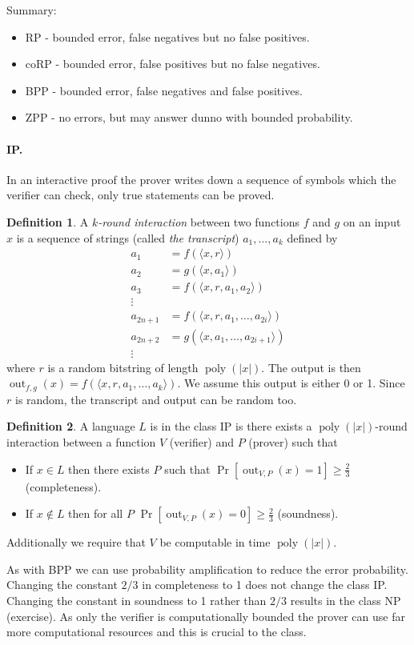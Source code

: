 \documentclass[11pt,a4paper]{article}
\theoremstyle{definition}
\newtheorem{defn}{Definition}
\DeclareMathOperator{\poly}{poly}
\DeclareMathOperator{\out}{out}
\begin{document}
Summary:
\begin{itemize}
\item RP - bounded error, false negatives but no false positives.
\item coRP - bounded error, false positives but no false negatives.
\item BPP - bounded error, false negatives and false positives.
\item ZPP - no errors, but may answer dunno with bounded probability.
\end{itemize}

\paragraph{IP.}
In an interactive proof the prover writes down a sequence of symbols which the verifier can check, only true statements can be proved.

\begin{defn}
A \emph{$k$-round interaction} between two functions $f$ and $g$ on an input $x$ is a sequence of strings (called \emph{the transcript}) $a_1,\ldots,a_k$ defined by
\begin{align*}
a_1 &= f(\langle x, r\rangle) \\
a_2 &= g(\langle x, a_1\rangle) \\
a_3 &= f(\langle x, r, a_1, a_2\rangle) \\
\vdots\\
a_{2n+1} &= f(\langle x, r, a_1,\ldots, a_{2i}\rangle) \\
a_{2n+2} &= g(\langle x, a_1,\ldots,a_{2i+1}\rangle) \\
\vdots
\end{align*}
where $r$ is a random bitstring of length $\poly(|x|)$.
The output is then $\out_{f,g}(x) = f(\langle x, r, a_1,\ldots,a_k\rangle)$.
We assume this output is either 0 or 1.
Since $r$ is random, the transcript and output can be random too.
\end{defn}

\begin{defn}
A language $L$ is in the class IP is there exists a $\poly(|x|)$-round interaction between a function $V$ (verifier) and $P$ (prover) such that 
\begin{itemize}
\item If $x\in L$ then there exists $P$ such that $\Pr[\out_{V,P}(x) = 1] \ge \frac{2}{3}$ (completeness).
\item If $x\not\in L$ then for all $P$ $\Pr[\out_{V,P}(x) = 0] \ge \frac{2}{3}$ (soundness).
\end{itemize}
Additionally we require that $V$ be computable in time $\poly(|x|)$.
\end{defn}
As with BPP we can use probability amplification to reduce the error probability.
Changing the constant $2/3$ in completeness to 1 does not change the class IP.
Changing the constant in soundness to 1 rather than $2/3$ results in the class NP (exercise).
As only the verifier is computationally bounded the prover can use far more computational resources and this is crucial to the class.
\end{document}
